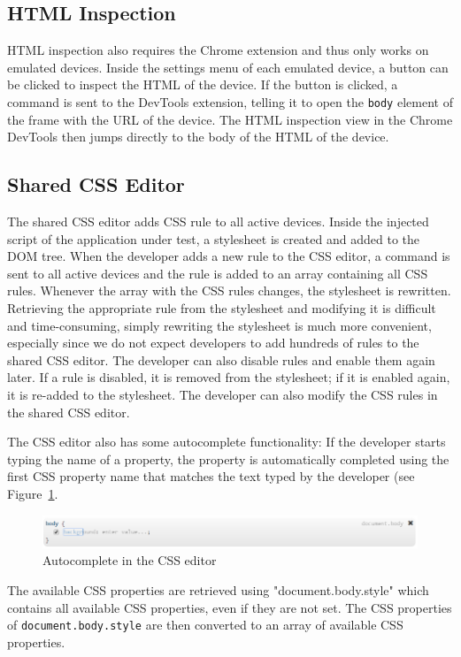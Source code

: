 \subsection{HTML Inspection}

HTML inspection also requires the Chrome extension and thus only works on emulated devices. Inside the settings menu of each emulated device, a button can be clicked to inspect the HTML of the device. If the button is clicked, a command is sent to the DevTools extension, telling it to open the \lstinline|body| element of the frame with the URL of the device. The HTML inspection view in the Chrome DevTools then jumps directly to the body of the HTML of the device.

\subsection{Shared CSS Editor}

The shared CSS editor adds CSS rule to all active devices. Inside the injected script of the application under test, a stylesheet is created and added to the DOM tree. When the developer adds a new rule to the CSS editor, a command is sent to all active devices and the rule is added to an array containing all CSS rules. Whenever the array with the CSS rules changes, the stylesheet is rewritten. Retrieving the appropriate rule from the stylesheet and modifying it is difficult and time-consuming, simply rewriting the stylesheet is much more convenient, especially since we do not expect developers to add hundreds of rules to the shared CSS editor. The developer can also disable rules and enable them again later. If a rule is disabled, it is removed from the stylesheet; if it is enabled again, it is re-added to the stylesheet. The developer can also modify the CSS rules in the shared CSS editor. 

The CSS editor also has some autocomplete functionality: If the developer starts typing the name of a property, the property is automatically completed using the first CSS property name that matches the text typed by the developer (see Figure~\ref{fig:css_autocomplete}.

\begin{figure}[H]
  \centering
    \includegraphics[width=1.0\textwidth]{images/screenshots/css_autocomplete.png}
	\caption[Screenshot: CSS editor autocomplete]{Autocomplete in the CSS editor}
	\label{fig:css_autocomplete}
\end{figure}
The available CSS properties are retrieved using "document.body.style" which contains all available CSS properties, even if they are not set. The CSS properties of \lstinline|document.body.style| are then converted to an array of available CSS properties.

